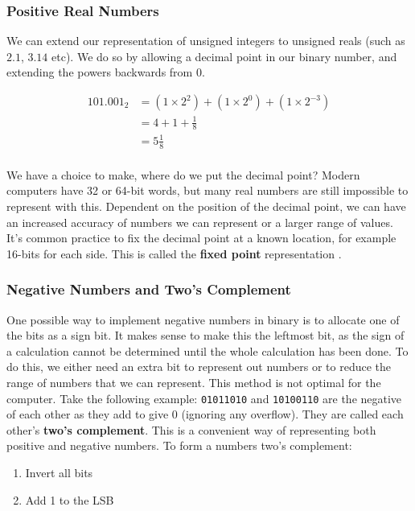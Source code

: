 \documentclass{article}
\begin{document}
	\subsubsection{Positive Real Numbers}
	We can extend our representation of unsigned integers to unsigned reals (such as $2.1$, $3.14$ etc). We do so by allowing a decimal point in our binary number, and extending the powers backwards from 0. 
	
	\begin{align*}
	101.001_{2} &= (1 \times 2^{2}) + (1 \times 2^{0}) + (1 \times 2^{-3}) \\
				&= 4 + 1 + \frac{1}{8}									   \\
				&= 5\frac{1}{8}                                            \\
	\end{align*}		
	
	We have a choice to make, where do we put the decimal point? Modern computers have 32 or 64-bit words, but many real numbers are still impossible to represent with this. Dependent on the position of the decimal point, we can have an increased accuracy of numbers we can represent or a larger range of values. It's common practice to fix the decimal point at a known location, for example 16-bits for each side. This is called the \textbf{fixed point} representation .
	
	\subsubsection{Negative Numbers and Two's Complement}
	One possible way to implement negative numbers in binary is to allocate one of the bits as a sign bit. It makes sense to make this the leftmost bit, as the sign of a calculation cannot be determined until the whole calculation has been done. To do this, we either need an extra bit to represent out numbers or to reduce the range of numbers that we can represent. This method is not optimal for the computer. Take the following example: \texttt{01011010} and \texttt{10100110} are the negative of each other as they add to give 0 (ignoring any overflow). They are called each other's \textbf{two's complement}. This is a convenient way of representing both positive and negative numbers. To form a numbers two's complement:
	\begin{enumerate}
		\item Invert all bits
		\item Add 1 to the LSB
	\end{enumerate}
	
\end{document}

